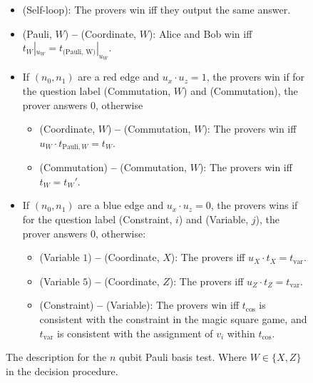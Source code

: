 \begin{figure}[!htbp]
\begin{gamespec}
\begin{center}
		\end{center}
		\begin{itemize}
			\item (Self-loop): The provers win iff they output the same answer. 
			\item (Pauli, $W$) \textbf{--}  (Coordinate, $W$): Alice and Bob win iff $t_{W}|_{u_W} = t_{\text{(Pauli, W)}}|_{u_W}$. 
			\item  If $(n_0, n_1)$ are a red edge and $u_x \cdot u_z = 1$, the provers win if for the question label (Commutation, $W$) and (Commutation), the prover answers $0$, otherwise
			\begin{itemize}
				\item  (Coordinate, $W$)  \color{red} \textbf{--}   \color{black}  (Commutation, $W$): The provers win iff $u_W \cdot t_{\text{Pauli},W} = t_W$. 
				\item  (Commutation)  \color{red} \textbf{--}   \color{black}  (Commutation, $W$): The provers win iff $t_W = t_W'$. 
			\end{itemize}
			\item If $(n_0, n_1)$ are a blue edge and $u_x \cdot u_z = 0$, the provers wins if for the question label (Constraint, $i$) and (Variable, $j$), the prover answers $0$, otherwise:
			\begin{itemize}
				\item (Variable $1$)  \color{blue} \textbf{--}   \color{black}  (Coordinate, $X$): The provers iff $u_X \cdot t_X = t_{\text{var}}$.
				\item (Variable $5$)  \color{blue} \textbf{--}   \color{black}  (Coordinate, $Z$): The provers iff $u_Z \cdot t_Z = t_{\text{var}}$.
				\item (Constraint)  \color{blue} \textbf{--}  \color{black}   (Variable): The provers win iff $t_{\text{cos}}$ is consistent with the constraint in the magic square game, and $t_{\text{var}}$ is consistent with the assignment of $v_i$ within $t_{\text{cos}}$. 
			\end{itemize}
		\end{itemize}
		\vspace{1em}
	\end{gamespec}
	\caption{The description for the $n$ qubit Pauli basis test. Where $W \in \{X, Z\}$ in the decision procedure. }
	\label{fig:PauliBasis}
\end{figure}



